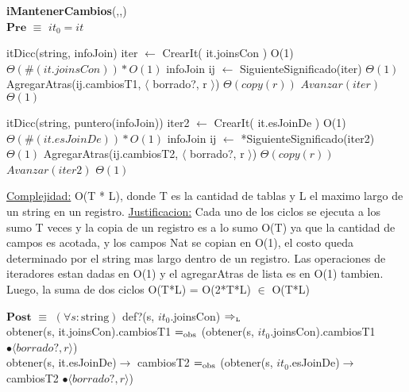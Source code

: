 \begin{algorithm}[H]{\textbf{iMantenerCambios}(,,)}
		{\\ $\textbf{Pre}$ $\equiv$  $it_0 = it$ }
    	\begin{algorithmic}[1]
    		\State itDicc(string, infoJoin) iter $\gets$ CrearIt( it.joinsCon )			\Comment O(1)
			               						\Comment $\Theta(\#(it.joinsCon)) * O(1)$
				\State infoJoin ij $\gets$ SiguienteSignificado(iter)					\Comment $\Theta(1)$
				\State AgregarAtras(ij.cambiosT1, $\langle$ borrado?, r $\rangle$)	 \Comment $\Theta(copy(r))$
			 	\State $Avanzar(iter)$	                     					 	\Comment $\Theta(1)$
			 \EndWhile

    		\State itDicc(string, puntero(infoJoin)) iter2 $\gets$ CrearIt( it.esJoinDe ) 	\Comment O(1)
			               			\Comment $\Theta(\#(it.esJoinDe)) * O(1)$
				\State infoJoin ij $\gets$ *SiguienteSignificado(iter2)		\Comment $\Theta(1)$
				\State AgregarAtras(ij.cambiosT2, $\langle$ borrado?, r $\rangle$)		\Comment $\Theta(copy(r))$
			 	\State $Avanzar(iter2)$	                     					 	\Comment $\Theta(1)$
			 \EndWhile

			\medskip
			\Statex \underline{Complejidad:} O(T * L), donde T es la cantidad de tablas y L el maximo largo de un string en un registro.
			\Statex \underline{Justificacion:} Cada uno de los ciclos se ejecuta a los sumo T veces y la copia de un registro es a lo sumo O(T) ya que la cantidad de campos es acotada, y los campos Nat se copian en O(1), el costo queda determinado por el string mas largo dentro de un registro. Las operaciones de iteradores estan dadas en O(1) y el agregarAtras de lista es en O(1) tambien. Luego, la suma de dos ciclos O(T*L) = O(2*T*L) $\in$ O(T*L)
    	\end{algorithmic}
	   {$\textbf{Post}$ $\equiv$ $(\forall s:\text{string})$  def?(s, $it_0$.joinsCon) $\Rightarrow_{\mathrm{\scriptscriptstyle{L}}}$ 
	  \\ obtener(s, it.joinsCon).cambiosT1 $=_{\mathrm{obs}}$  (obtener(s, $it_0$.joinsCon).cambiosT1 $\bullet \langle borrado?, r \rangle$) 
	   \\ obtener(s, it.esJoinDe)$\rightarrow$ cambiosT2 $=_{\mathrm{obs}}$  (obtener(s, $it_0$.esJoinDe)$\rightarrow$ cambiosT2 $\bullet \langle borrado?, r \rangle$)     }
\end{algorithm}




